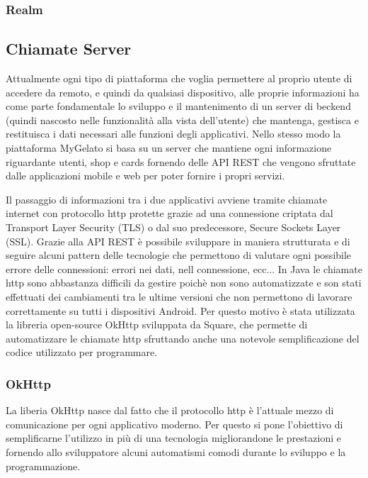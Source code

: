 \subsubsection{Realm}

\subsection{Chiamate Server}
Attualmente ogni tipo di piattaforma che voglia permettere al proprio utente di accedere da remoto, e quindi da qualsiasi dispositivo, alle proprie informazioni ha come parte fondamentale lo sviluppo e il mantenimento di un server di beckend (quindi nascosto nelle funzionalità alla vista dell'utente) che mantenga, gestisca e restituisca i dati necessari alle funzioni degli applicativi.
Nello stesso modo la piattaforma MyGelato si basa su un server che mantiene ogni informazione riguardante utenti, shop e cards fornendo delle API REST che vengono sfruttate dalle applicazioni mobile e web per poter fornire i propri servizi.

Il passaggio di informazioni tra i due applicativi avviene tramite chiamate internet con protocollo http protette grazie ad una connessione criptata dal Transport Layer Security (TLS) o dal suo predecessore, Secure Sockets Layer (SSL).
Grazie alla API REST è possibile sviluppare in maniera strutturata e di seguire alcuni pattern delle tecnologie che permettono di valutare ogni possibile errore delle connessioni: errori nei dati, nell connessione, ecc...
In Java le chiamate http sono abbastanza difficili da gestire poichè non sono automatizzate e son stati effettuati dei cambiamenti tra le ultime versioni che non permettono di lavorare correttamente su tutti i dispositivi Android.
Per questo motivo è stata utilizzata la libreria open-source OkHttp sviluppata da Square, che permette di automatizzare le chiamate http sfruttando anche una notevole semplificazione del codice utilizzato per programmare. \autocite{SQUARE:OKHTTP}

\subsubsection{OkHttp}
La liberia OkHttp nasce dal fatto che il protocollo http è l'attuale mezzo di comunicazione per ogni applicativo moderno.
Per questo si pone l'obiettivo di semplificarne l'utilizzo in più di una tecnologia migliorandone le prestazioni e fornendo allo sviluppatore alcuni automatismi comodi durante lo sviluppo e la programmazione.

